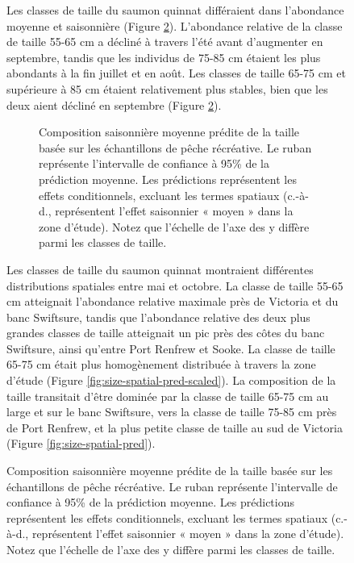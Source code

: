\begin{figure}[H]
Les classes de taille du saumon quinnat différaient dans l'abondance moyenne et saisonnière (Figure \ref{fig:season-pred-size}). L'abondance relative de la classe de taille 55-65 cm a décliné à travers l'été avant d'augmenter en septembre, tandis que les individus de 75-85 cm étaient les plus abondants à la fin juillet et en août. Les classes de taille 65-75 cm et supérieure à 85 cm étaient relativement plus stables, bien que les deux aient décliné en septembre (Figure \ref{fig:season-pred-size}).

\begin{figure}[H]
    \centering
    \caption{Composition saisonnière moyenne prédite de la taille basée sur les échantillons de pêche récréative. Le ruban représente l'intervalle de confiance à 95\% de la prédiction moyenne. Les prédictions représentent les effets conditionnels, excluant les termes spatiaux (c.-à-d., représentent l'effet saisonnier « moyen » dans la zone d'étude). Notez que l'échelle de l'axe des y diffère parmi les classes de taille.}
    \label{fig:season-pred-size}
\end{figure}

Les classes de taille du saumon quinnat montraient différentes distributions spatiales entre mai et octobre. La classe de taille 55-65 cm atteignait l'abondance relative maximale près de Victoria et du banc Swiftsure, tandis que l'abondance relative des deux plus grandes classes de taille atteignait un pic près des côtes du banc Swiftsure, ainsi qu'entre Port Renfrew et Sooke. La classe de taille 65-75 cm était plus homogènement distribuée à travers la zone d'étude (Figure \ref{fig:size-spatial-pred-scaled}). La composition de la taille transitait d'être dominée par la classe de taille 65-75 cm au large et sur le banc Swiftsure, vers la classe de taille 75-85 cm près de Port Renfrew, et la plus petite classe de taille au sud de Victoria (Figure \ref{fig:size-spatial-pred}).


\end{figure}
